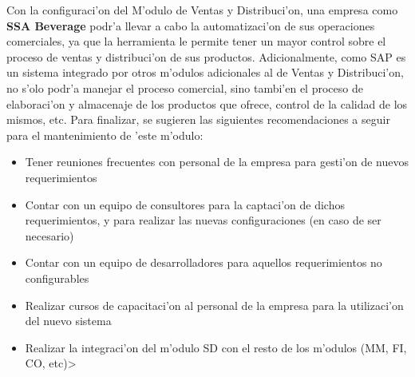 \newline
\newline
\indent Con la configuraci'on del M'odulo de Ventas y Distribuci'on, una empresa como \textbf{SSA Beverage} podr'a llevar a cabo la automatizaci'on de sus operaciones comerciales, ya que la herramienta le permite tener un mayor control sobre el proceso de ventas y distribuci'on de sus productos. Adicionalmente, como SAP es un sistema integrado por otros m'odulos adicionales al de Ventas y Distribuci'on, no s'olo podr'a manejar el proceso comercial, sino tambi'en el proceso de elaboraci'on y almacenaje de los productos que ofrece, control de la calidad de los mismos, etc.
	Para finalizar, se sugieren las siguientes recomendaciones a seguir para el mantenimiento de 'este m'odulo:

\begin{itemize}
\item Tener reuniones frecuentes con personal de la empresa para gesti'on de nuevos requerimientos
\item Contar con un equipo de consultores para la captaci'on de dichos requerimientos, y para realizar las nuevas configuraciones (en caso de ser necesario)
\item Contar con un equipo de desarrolladores para aquellos requerimientos no configurables
\item Realizar cursos de capacitaci'on al personal de la empresa para la utilizaci'on del nuevo sistema
\item Realizar la integraci'on del m'odulo SD con el resto de los m'odulos (MM, FI, CO, etc)>
\end{itemize}